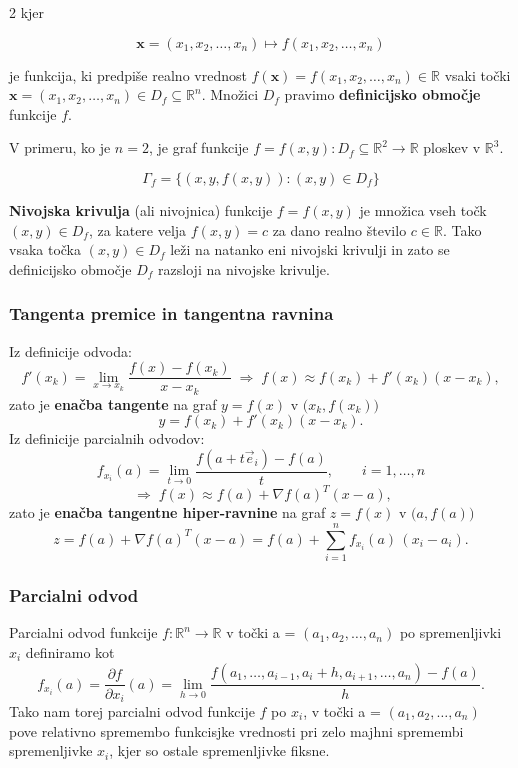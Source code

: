 \documentclass{article}
\begin{document}
\begin{multicols}{2}
	kjer

	\[
		\mathbf{x} = (x_1, x_2, \ldots, x_n) \mapsto f(x_1, x_2, \ldots, x_n)
	\]

	je funkcija, ki predpiše realno vrednost $f(\mathbf{x}) = f(x_1, x_2, \ldots, x_n) \in \mathbb{R}$ vsaki točki $\mathbf{x} = (x_1, x_2, \ldots, x_n) \in D_f \subseteq \mathbb{R}^n$. Množici $D_f$ pravimo \textbf{definicijsko območje} funkcije $f$.

	V primeru, ko je $n = 2$, je graf funkcije $f = f(x, y): D_f \subseteq \mathbb{R}^2 \to \mathbb{R}$ ploskev v $\mathbb{R}^3$.

	\[
		\Gamma_f = \{ (x, y, f(x, y)) : (x, y) \in D_f \}
	\]

	\textbf{Nivojska krivulja} (ali nivojnica) funkcije $f = f(x, y)$ je množica vseh točk $(x, y) \in D_f$, za katere velja $f(x, y) = c$ za dano realno število $c \in \mathbb{R}$. Tako vsaka točka $(x, y) \in D_f$ leži na natanko eni nivojski krivulji in zato se definicijsko območje $D_f$ razsloji na nivojske krivulje.

	\subsubsection{Tangenta premice in tangentna ravnina}

	Iz definicije odvoda:
	\[
		f'(x_k)=\lim_{x\to x_k}\frac{f(x)-f(x_k)}{x-x_k}
		\;\Rightarrow\;
		f(x)\approx f(x_k)+f'(x_k)(x-x_k),
	\]
	zato je \textbf{enačba tangente} na graf \(y=f(x)\) v \(\bigl(x_k,f(x_k)\bigr)\)
	\[
		y = f(x_k) + f'(x_k)(x-x_k).
	\]
	Iz definicije parcialnih odvodov:
	\[
		f_{x_i}(a)=\lim_{t\to 0}\frac{f(a+t\vec e_i)-f(a)}{t},
		\qquad i=1,\dots,n
	\]
	\[
		\;\Rightarrow\;
		f(x)\approx f(a)+\nabla f(a)^T(x-a),
	\]
	zato je \textbf{enačba tangentne hiper-ravnine} na graf \(z=f(x)\) v \(\bigl(a,f(a)\bigr)\)
	\[
		z = f(a) + \nabla f(a)^{T}(x-a)
		= f(a) + \sum_{i=1}^{n} f_{x_i}(a)\,(x_i-a_i).
	\]


	\subsubsection{Parcialni odvod}
	Parcialni odvod funkcije \( f: \mathbb{R}^n \rightarrow \mathbb{R} \) v točki a = \( (a_1, a_2, \ldots, a_n) \) po spremenljivki \( x_i \) definiramo kot
	\[
		f_{x_i}(a) = \frac{\partial f}{\partial x_i}(a) = \lim_{h \to 0} \frac{f(a_1, \ldots, a_{i-1}, a_i + h, a_{i+1}, \ldots, a_n) - f(a)}{h}.
	\]
	Tako nam torej parcialni odvod funkcije \( f \) po \( x_i \), v točki a = \( (a_1, a_2, \ldots, a_n) \) pove relativno spremembo funkcisjke vrednosti pri zelo majhni spremembi spremenljivke \( x_i \), kjer so ostale spremenljivke fiksne.


\end{multicols}
\end{document}
